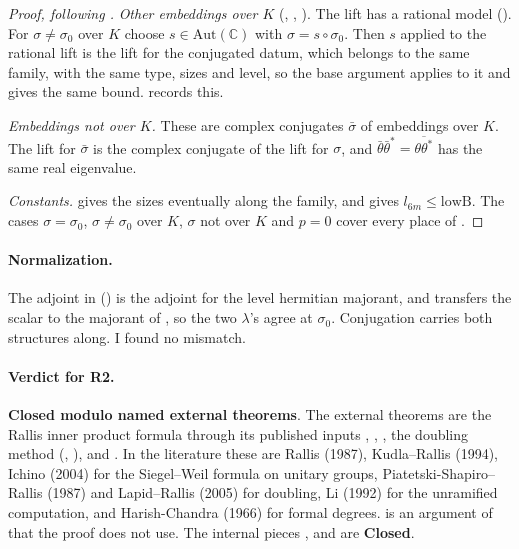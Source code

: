 \documentclass[11pt]{article}
\newcommand{\sC}{\textbf{Closed}}
\newcommand{\sE}{\textbf{Closed modulo named external theorems}}
\theoremstyle{remark}
\begin{document}
\begin{proof}[Proof, following ]
\emph{Other embeddings over $K$} (, , ). The lift has a rational model (). For $\sigma\ne\sigma_0$ over $K$ choose $s\in\mathrm{Aut}(\mathbb C)$ with $\sigma=s\circ\sigma_0$. Then $s$ applied to the rational lift is the lift for the conjugated datum, which belongs to the same family, with the same type, sizes and level, so the base argument applies to it and gives the same bound.  records this.

\emph{Embeddings not over $K$.} These are complex conjugates $\bar\sigma$ of embeddings over $K$. The lift for $\bar\sigma$ is the complex conjugate of the lift for $\sigma$, and $\bar\theta\bar\theta^*=\overline{\theta\theta^*}$ has the same real eigenvalue.

\emph{Constants.}  gives the sizes eventually along the family, and  gives $l_{6m}\le\mathrm{lowB}$. The cases $\sigma=\sigma_0$, $\sigma\ne\sigma_0$ over $K$, $\sigma$ not over $K$ and $p=0$ cover every place of .
\end{proof}

\paragraph{Normalization.} The adjoint in  () is the adjoint for the level hermitian majorant, and  transfers the scalar to the majorant of , so the two $\lambda$'s agree at $\sigma_0$. Conjugation carries both structures along. I found no mismatch.

\paragraph{Verdict for R2.} \sE. The external theorems are the Rallis inner product formula through its published inputs , , , the doubling method (, ),  and . In the literature these are Rallis (1987), Kudla--Rallis (1994), Ichino (2004) for the Siegel--Weil formula on unitary groups, Piatetski-Shapiro--Rallis (1987) and Lapid--Rallis (2005) for doubling, Li (1992) for the unramified computation, and Harish-Chandra (1966) for formal degrees.  is an argument of  that the proof does not use. The internal pieces ,  and  are \sC.
\end{document}
